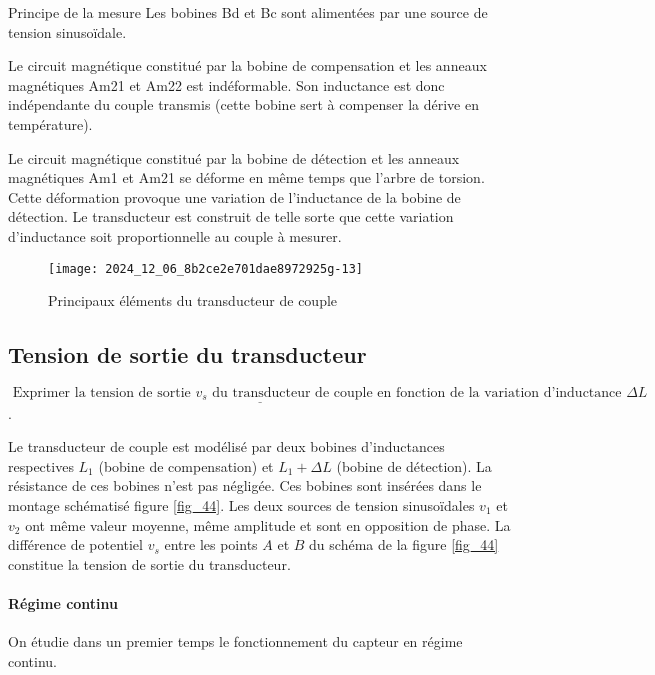 Principe de la mesure Les bobines Bd et Bc sont alimentées par une source de tension sinusoïdale.

Le circuit magnétique constitué par la bobine de compensation et les anneaux magnétiques Am21 et Am22 est indéformable. Son inductance est donc indépendante du couple transmis (cette bobine sert à compenser la dérive en température).

Le circuit magnétique constitué par la bobine de détection et les anneaux magnétiques Am1 et Am21 se déforme en même temps que l'arbre de torsion. Cette déformation provoque une variation de l'inductance de la bobine de détection. Le transducteur est construit de telle sorte que cette variation d'inductance soit proportionnelle au couple à mesurer.

\begin{figure}[!htb]
\begin{center}
\texttt{[image: 2024\_12\_06\_8b2ce2e701dae8972925g-13]}
\caption{Principaux éléments du transducteur de couple \label{fig_43}}
\end{center}
\end{figure}


\subsection{Tension de sortie du transducteur}

\begin{obj}
\(\underline{\text { Exprimer la tension de sortie } v_{s} \text { du transducteur de couple en fonction de la variation d'inductance } \Delta L}\).
\end{obj}

Le transducteur de couple est modélisé par deux bobines d'inductances respectives \(L_{1}\) (bobine de compensation) et \(L_{1}+\Delta L\) (bobine de détection). La résistance de ces bobines n'est pas négligée. Ces bobines sont insérées dans le montage schématisé figure \ref{fig_44}. Les deux sources de tension sinusoïdales \(v_{1}\) et \(v_{2}\) ont même valeur moyenne, même amplitude et sont en opposition de phase. La différence de potentiel \(v_{s}\) entre les points \(A\) et \(B\) du schéma de la figure \ref{fig_44} constitue la tension de sortie du transducteur.

\paragraph*{Régime continu}
On étudie dans un premier temps le fonctionnement du capteur en régime continu.


